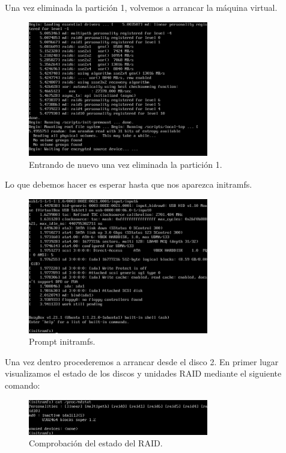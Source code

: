 Una vez eliminada la partición 1, volvemos a arrancar la máquina virtual.
\begin{figure}[H]
	\begin{center}
		\includegraphics[width=0.7\textwidth]{Imagenes/03_Entrando1}
		\caption{Entrando de nuevo una vez eliminada la partición 1.} \label{fig:figura3}
		\end{center}
\end{figure}
\newpage
Lo que debemos hacer es esperar hasta que nos aparezca initramfs.
\begin{figure}[H]
	\begin{center}		
		\includegraphics[width=0.7\textwidth]{Imagenes/04_Entrando2}
		\caption{Prompt initramfs.} \label{fig:figura4}
	\end{center}
\end{figure}
Una vez dentro procederemos a arrancar desde el disco 2. En primer lugar visualizamos el estado de los discos y unidades RAID mediante el siguiente comando:
\begin{figure}[H]
	\begin{center}		
		\includegraphics[width=0.7\textwidth]{Imagenes/05_visualizando_actividad}
		\caption{Comprobación del estado del RAID.} \label{fig:figura5}
	\end{center}
\end{figure}
